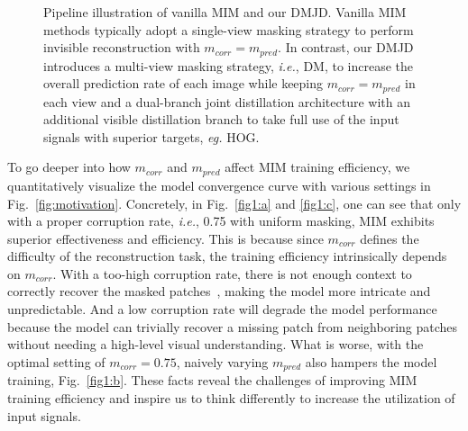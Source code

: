 \documentclass[lettersize,journal]{IEEEtran}
\begin{document}
\begin{figure}[!t]
\centering
    \quad
\vspace{4mm}
\caption{Pipeline illustration of vanilla MIM and our DMJD.
Vanilla MIM methods typically adopt a single-view masking strategy to perform invisible reconstruction with $m_{corr} = m_{pred}$. In contrast, our DMJD introduces a multi-view masking strategy, \textit{i.e.}, DM, to increase the overall prediction rate of each image while keeping $m_{corr} = m_{pred}$ in each view and a dual-branch joint distillation architecture with an additional visible distillation branch to take full use of the input signals with superior targets, \textit{eg.} HOG. 
}
\label{fig:viz}
\end{figure}
To go deeper into how $m_{corr}$ and $m_{pred}$ affect MIM training efficiency, we quantitatively visualize the model convergence curve with various settings in Fig.~\ref{fig:motivation}. 
Concretely, in Fig.~\ref{fig1:a} and \ref{fig1:c}, one can see that only with a proper corruption rate, \textit{i.e.}, 0.75 with uniform masking, MIM exhibits superior effectiveness and efficiency.
This is because since $m_{corr}$ defines the difficulty of the reconstruction task, the training efficiency intrinsically depends on $m_{corr}$. With a too-high corruption rate, there is not enough context to correctly recover the masked patches~\cite{2021arXiv211106377H}, making the model more intricate and unpredictable. And a low corruption rate will degrade the model performance because the model can trivially recover a missing patch from neighboring patches without needing a high-level visual understanding. 
What is worse, with the optimal setting of $m_{corr}= 0.75$, naively varying $m_{pred}$ also hampers the model training, Fig.~\ref{fig1:b}.
These facts reveal the challenges of improving MIM training efficiency and inspire us to think differently to increase the utilization of input signals.
\end{document}

